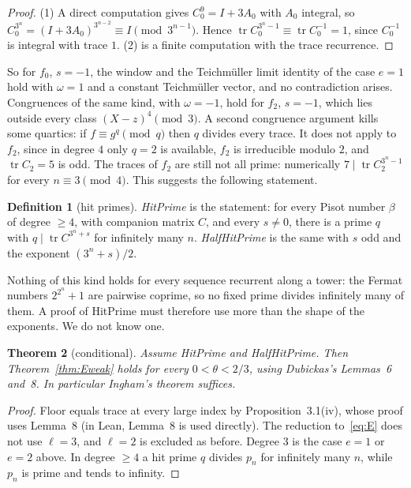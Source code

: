 \documentclass[11pt]{amsart}
\newtheorem{theorem}{Theorem}[section]
\theoremstyle{definition}
\newtheorem{definition}[theorem]{Definition}
\newcommand{\tr}{\operatorname{tr}}
\begin{document}
\begin{proof}
(1) A direct computation gives $C_0^9=I+3A_0$ with $A_0$ integral, so $C_0^{3^n}=(I+3A_0)^{3^{n-2}}\equiv I\pmod{3^{n-1}}$.  Hence $\tr C_0^{3^n-1}\equiv\tr C_0^{-1}=1$, since $C_0^{-1}$ is integral with trace $1$.  (2) is a finite computation with the trace recurrence.
\end{proof}

So for $f_0$, $s=-1$, the window and the Teichm\"uller limit identity of the case $e=1$ hold with $\omega=1$ and a constant Teichm\"uller vector, and no contradiction arises.  Congruences of the same kind, with $\omega=-1$, hold for $f_2$, $s=-1$, which lies outside every class $(X-z)^4\pmod3$.  A second congruence argument kills some quartics: if $f\equiv g^q\pmod q$ then $q$ divides every trace.  It does not apply to $f_2$, since in degree $4$ only $q=2$ is available, $f_2$ is irreducible modulo $2$, and $\tr C_2=5$ is odd.  The traces of $f_2$ are still not all prime: numerically $7\mid\tr C_2^{3^n-1}$ for every $n\equiv3\pmod4$.  This suggests the following statement.

\begin{definition}[hit primes]\label{def:hit}
\emph{HitPrime} is the statement: for every Pisot number $\beta$ of degree $\ge4$, with companion matrix $C$, and every $s\neq0$, there is a prime $q$ with $q\mid\tr C^{3^n+s}$ for infinitely many $n$.  \emph{HalfHitPrime} is the same with $s$ odd and the exponent $(3^n+s)/2$.
\end{definition}

Nothing of this kind holds for every sequence recurrent along a tower: the Fermat numbers $2^{2^n}+1$ are pairwise coprime, so no fixed prime divides infinitely many of them.  A proof of HitPrime must therefore use more than the shape of the exponents.  We do not know one.

\begin{theorem}[conditional]\label{thm:Econd}
Assume HitPrime and HalfHitPrime.  Then Theorem~\ref{thm:Eweak} holds for every $0<\theta<2/3$, using Dubickas's Lemmas~6 and~8.  In particular Ingham's theorem suffices.
\end{theorem}

\begin{proof}
Floor equals trace at every large index by Proposition~3.1(iv), whose proof uses Lemma~8 (in Lean, Lemma~8 is used directly).  The reduction to~\eqref{eq:E} does not use $\ell=3$, and $\ell=2$ is excluded as before.  Degree $3$ is the case $e=1$ or $e=2$ above.  In degree $\ge4$ a hit prime $q$ divides $p_n$ for infinitely many $n$, while $p_n$ is prime and tends to infinity.
\end{proof}
\end{document}
